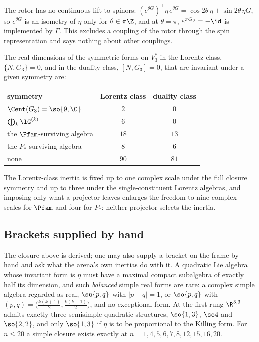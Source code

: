 The rotor has no continuous lift to spinors: $(e^{\theta G})^{\!\top}\eta\,e^{\theta G}=\cos2\theta\,\eta+\sin2\theta\,\eta G$, so $e^{\theta G}$ is an isometry of
$\eta$ only for $\theta\in\pi\Z$, and at $\theta=\pi$, $e^{\pi G_3}=-\id$ is implemented by $\Gamma$. This excludes a coupling of the rotor through the
spin representation and says nothing about other couplings.

\begin{theorem}
\label{thm:inertia3}
The real dimensions of the symmetric forms on $V_3^*$ in the Lorentz class, $\{N,G_3\}=0$, and in the duality class, $[N,G_3]=0$, that are invariant
under a given symmetry are:
\begin{center}
\begin{tabular}{@{}lcc@{}}
\toprule
symmetry & Lorentz class & duality class\\
\midrule
$\Cent(G_3)=\so{9,\C}$ & $2$ & $0$\\
$\bigoplus_k\lG^{(k)}$ & $6$ & $0$\\
the $\Pfam$-surviving algebra & $18$ & $13$\\
the $P_*$-surviving algebra & $8$ & $6$\\
none & $90$ & $81$\\
\bottomrule
\end{tabular}
\end{center}
\end{theorem}

The Lorentz-class inertia is fixed up to one complex scale under the full closure symmetry and up to three under the single-constituent Lorentz
algebras, and imposing only what a projector leaves enlarges the freedom to nine complex scales for $\Pfam$ and four for $P_*$: neither projector
selects the inertia.

\subsection{Brackets supplied by hand}

The closure above is derived; one may also supply a bracket on the frame by hand and ask what the arena's own inertias do with it. A quadratic Lie
algebra whose invariant form is $\eta$ must have a maximal compact subalgebra of exactly half its dimension, and such \emph{balanced} simple real forms
are rare: a complex simple algebra regarded as real, $\su{p,q}$ with $|p-q|=1$, or $\so{p,q}$ with $(p,q)=\bigl(\tfrac{k(k+1)}2,\tfrac{k(k-1)}2\bigr)$, and
no exceptional form. At the first rung $\R^{3,3}$ admits exactly three semisimple quadratic structures, $\so{1,3}$, $\so4$ and $\so{2,2}$, and only
$\so{1,3}$ if $\eta$ is to be proportional to the Killing form. For $n\le20$ a simple closure exists exactly at $n=1,4,5,6,7,8,12,15,16,20$.


